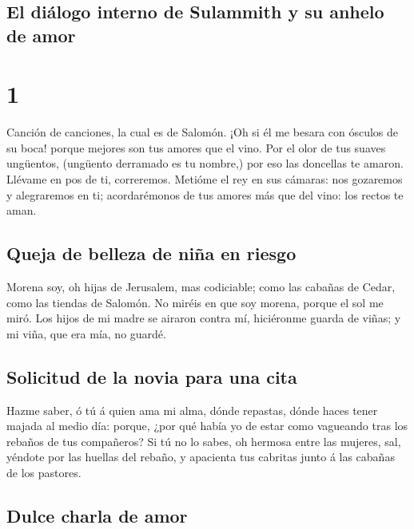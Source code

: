 \hypertarget{el-diuxe1logo-interno-de-sulammith-y-su-anhelo-de-amor}{%
\subsection{El diálogo interno de Sulammith y su anhelo de
amor}\label{el-diuxe1logo-interno-de-sulammith-y-su-anhelo-de-amor}}

\hypertarget{section}{%
\section{1}\label{section}}

 Canción de canciones, la cual es de Salomón. 
¡Oh si él me besara con ósculos de su boca! porque mejores son tus
amores que el vino.  Por el olor de tus suaves ungüentos,
(ungüento derramado es tu nombre,) por eso las doncellas te amaron.
 Llévame en pos de ti, correremos. Metióme el rey en sus
cámaras: nos gozaremos y alegraremos en ti; acordarémonos de tus amores
más que del vino: los rectos te aman.

\hypertarget{queja-de-belleza-de-niuxf1a-en-riesgo}{%
\subsection{Queja de belleza de niña en
riesgo}\label{queja-de-belleza-de-niuxf1a-en-riesgo}}

 Morena soy, oh hijas de Jerusalem, mas codiciable; como las
cabañas de Cedar, como las tiendas de Salomón.  No miréis en
que soy morena, porque el sol me miró. Los hijos de mi madre se airaron
contra mí, hiciéronme guarda de viñas; y mi viña, que era mía, no
guardé.

\hypertarget{solicitud-de-la-novia-para-una-cita}{%
\subsection{Solicitud de la novia para una
cita}\label{solicitud-de-la-novia-para-una-cita}}

 Hazme saber, ó tú á quien ama mi alma, dónde repastas,
dónde haces tener majada al medio día: porque, ¿por qué había yo de
estar como vagueando tras los rebaños de tus compañeros?  Si
tú no lo sabes, oh hermosa entre las mujeres, sal, yéndote por las
huellas del rebaño, y apacienta tus cabritas junto á las cabañas de los
pastores.

\hypertarget{dulce-charla-de-amor}{%
\subsection{Dulce charla de amor}\label{dulce-charla-de-amor}}

